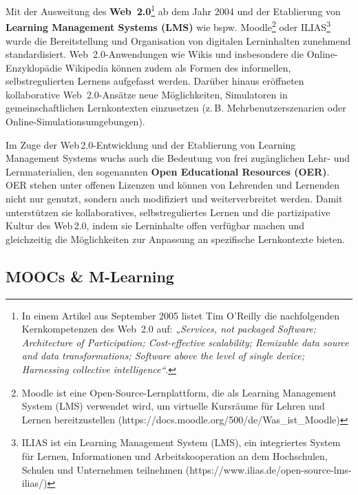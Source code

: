 Mit der Ausweitung des \textbf{Web~2.0}\footnote{In einem Artikel aus September 2005 listet Tim O'Reilly die nachfolgenden Kernkompetenzen des Web~2.0 auf: \textit{„Services, not packaged Software; Architecture of Participation; Cost-effective scalability; Remixable data source and data transformations; Software above the level of single device; Harnessing collective intelligence“}\cite{oreilly_what_2005}.} ab dem Jahr 2004 und der Etablierung von \textbf{Learning Management Systems (LMS)} wie bspw. Moodle\footnote{Moodle ist eine Open-Source-Lernplattform, die als Learning Management System (LMS) verwendet wird, um virtuelle Kursräume für Lehren und Lernen bereitzustellen (https://docs.moodle.org/500/de/Was_ist_Moodle)} oder ILIAS\footnote{ILIAS ist ein Learning Management System (LMS), ein integriertes System für Lernen, Informationen und Arbeitskooperation an dem Hochschulen, Schulen und Unternehmen teilnehmen (https://www.ilias.de/open-source-lms-ilias/)} wurde die Bereitstellung und Organisation von digitalen Lerninhalten zunehmend standardisiert. Web~2.0-Anwendungen wie Wikis und insbesondere die Online-Enzyklopädie Wikipedia können zudem als Formen des informellen, selbstregulierten Lernens aufgefasst werden.\parencite[S.~14]{niegemann_kompendium_2008} Darüber hinaus eröffneten kollaborative Web~2.0-Ansätze neue Möglichkeiten, Simulatoren in gemeinschaftlichen Lernkontexten einzusetzen (z.\,B. Mehrbenutzerszenarien oder Online-Simulationsumgebungen).\parencite[S.~129f]{gallagher_assessing_2007}

Im Zuge der Web 2.0-Entwicklung und der Etablierung von Learning Management Systems wuchs auch die Bedeutung von frei zugänglichen Lehr- und Lernmaterialien, den sogenannten \textbf{Open Educational Resources (OER)}. OER stehen unter offenen Lizenzen und können von Lehrenden und Lernenden nicht nur genutzt, sondern auch modifiziert und weiterverbreitet werden. Damit unterstützen sie kollaboratives, selbstreguliertes Lernen und die partizipative Kultur des Web 2.0, indem sie Lerninhalte offen verfügbar machen und gleichzeitig die Möglichkeiten zur Anpassung an spezifische Lernkontexte bieten.\parencite[S.~1]{unesco_guidelines_2011}\parencite[S.~194f]{fluhler_open_2024}

\subsection{MOOCs \& M-Learning}

